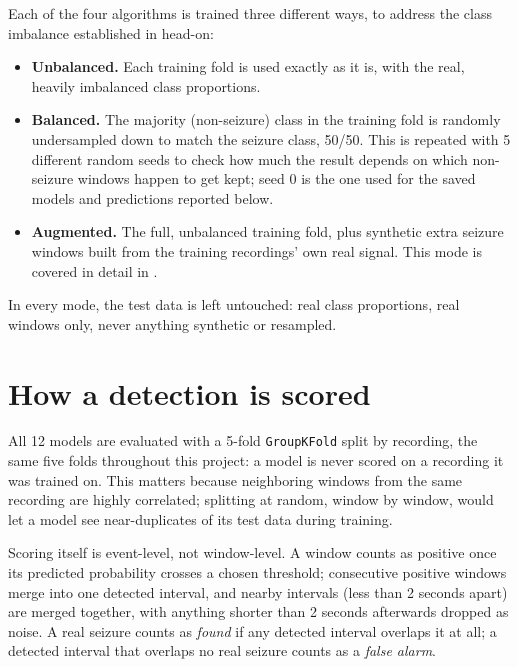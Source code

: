 Each of the four algorithms is trained three different ways, to address the class imbalance
established in  head-on:

\begin{itemize}[leftmargin=1.4em]
  \item \textbf{Unbalanced.} Each training fold is used exactly as it is, with the real,
    heavily imbalanced class proportions.
  \item \textbf{Balanced.} The majority (non-seizure) class in the training fold is randomly
    undersampled down to match the seizure class, 50/50. This is repeated with 5 different
    random seeds to check how much the result depends on which non-seizure windows happen to
    get kept; seed 0 is the one used for the saved models and predictions reported below.
  \item \textbf{Augmented.} The full, unbalanced training fold, plus synthetic extra seizure
    windows built from the training recordings' own real signal. This mode is covered in detail
    in .
\end{itemize}

In every mode, the test data is left untouched: real class proportions, real windows only, never
anything synthetic or resampled.

\section{How a detection is scored}

All 12 models are evaluated with a 5-fold \texttt{GroupKFold} split by recording, the same five
folds throughout this project: a model is never scored on a recording it was trained on. This
matters because neighboring windows from the same recording are highly correlated; splitting at
random, window by window, would let a model see near-duplicates of its test data during
training.

Scoring itself is event-level, not window-level. A window counts as positive once its predicted
probability crosses a chosen threshold; consecutive positive windows merge into one detected
interval, and nearby intervals (less than 2 seconds apart) are merged together, with anything
shorter than 2 seconds afterwards dropped as noise. A real seizure counts as \emph{found} if any
detected interval overlaps it at all; a detected interval that overlaps no real seizure counts
as a \emph{false alarm}.

